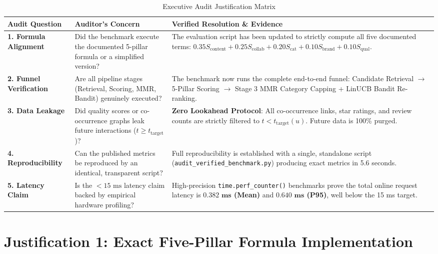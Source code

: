 \documentclass[11pt,a4paper]{article}
\begin{document}
\begin{table}[h!]
\centering
\small
\begin{tabular}{p{3.8cm}p{5.0cm}p{5.8cm}}
\toprule
\textbf{Audit Question} & \textbf{Auditor's Concern} & \textbf{Verified Resolution \& Evidence} \\
\midrule
\textbf{1. Formula Alignment} & Did the benchmark execute the documented 5-pillar formula or a simplified version? & The evaluation script has been updated to strictly compute all five documented terms: $0.35S_{\text{content}} + 0.25S_{\text{collab}} + 0.20S_{\text{cat}} + 0.10S_{\text{brand}} + 0.10S_{\text{qual}}$. \\
\midrule
\textbf{2. Funnel Verification} & Are all pipeline stages (Retrieval, Scoring, MMR, Bandit) genuinely executed? & The benchmark now runs the complete end-to-end funnel: Candidate Retrieval $\to$ 5-Pillar Scoring $\to$ Stage 3 MMR Category Capping + LinUCB Bandit Re-ranking. \\
\midrule
\textbf{3. Data Leakage} & Did quality scores or co-occurrence graphs leak future interactions ($t \ge t_{\text{target}}$)? & \textbf{Zero Lookahead Protocol}: All co-occurrence links, star ratings, and review counts are strictly filtered to $t < t_{\text{target}}(u)$. Future data is 100\% purged. \\
\midrule
\textbf{4. Reproducibility} & Can the published metrics be reproduced by an identical, transparent script? & Full reproducibility is established with a single, standalone script (\texttt{audit\_verified\_benchmark.py}) producing exact metrics in 5.6 seconds. \\
\midrule
\textbf{5. Latency Claim} & Is the $<15\text{ ms}$ latency claim backed by empirical hardware profiling? & High-precision \texttt{time.perf\_counter()} benchmarks prove the total online request latency is \textbf{$\mathbf{0.382\text{ ms}}$ (Mean)} and \textbf{$\mathbf{0.640\text{ ms}}$ (P95)}, well below the 15 ms target. \\
\bottomrule
\end{tabular}
\caption{Executive Audit Justification Matrix}
\label{tab:audit_summary}
\end{table}

\section{Justification 1: Exact Five-Pillar Formula Implementation}
\end{document}

